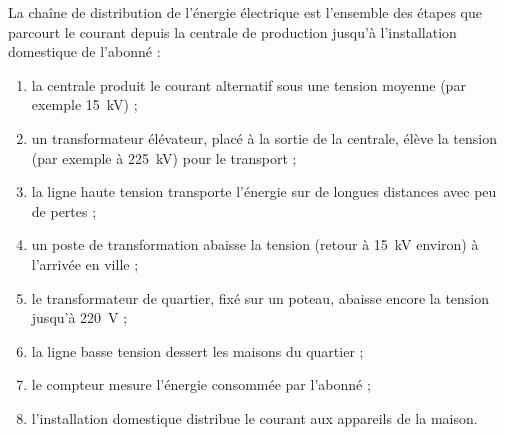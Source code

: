 \documentclass[11pt]{article}
\newcommand{\cle}[1]{{\popxbold\color{popdark}#1}}
\begin{document}
\begin{definition}
La \cle{chaîne de distribution} de l'énergie électrique est l'ensemble des étapes que parcourt le courant depuis la centrale de production jusqu'à l'installation domestique de l'abonné :
\begin{enumerate}
\item la \cle{centrale} produit le courant alternatif sous une tension moyenne (par exemple \SI{15}{kV}) ;
\item un \cle{transformateur élévateur}, placé à la sortie de la centrale, élève la tension (par exemple à \SI{225}{kV}) pour le transport ;
\item la \cle{ligne haute tension} transporte l'énergie sur de longues distances avec peu de pertes ;
\item un \cle{poste de transformation} abaisse la tension (retour à \SI{15}{kV} environ) à l'arrivée en ville ;
\item le \cle{transformateur de quartier}, fixé sur un poteau, abaisse encore la tension jusqu'à \SI{220}{V} ;
\item la \cle{ligne basse tension} dessert les maisons du quartier ;
\item le \cle{compteur} mesure l'énergie consommée par l'abonné ;
\item l'\cle{installation domestique} distribue le courant aux appareils de la maison.
\end{enumerate}
\end{definition}
\end{document}
